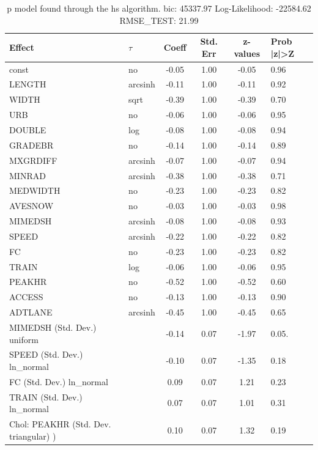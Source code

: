 \begin{table}
	\caption{p model found through the hs algorithm. bic: 45337.97 Log-Likelihood: -22584.62 RMSE_TEST: 21.99}
	\begin{center}
		\begin{tabular}{|l|l|c|c|c|l|}
			\hline
			Effect & $\tau$ & Coeff & Std. Err & z-values & Prob |z|>Z \\
			\hline
			const & no & -0.05 & 1.00 & -0.05 & 0.96 \\
			\hline
			LENGTH & arcsinh & -0.11 & 1.00 & -0.11 & 0.92 \\
			\hline
			WIDTH & sqrt & -0.39 & 1.00 & -0.39 & 0.70 \\
			\hline
			URB & no & -0.06 & 1.00 & -0.06 & 0.95 \\
			\hline
			DOUBLE & log & -0.08 & 1.00 & -0.08 & 0.94 \\
			\hline
			GRADEBR & no & -0.14 & 1.00 & -0.14 & 0.89 \\
			\hline
			MXGRDIFF & arcsinh & -0.07 & 1.00 & -0.07 & 0.94 \\
			\hline
			MINRAD & arcsinh & -0.38 & 1.00 & -0.38 & 0.71 \\
			\hline
			MEDWIDTH & no & -0.23 & 1.00 & -0.23 & 0.82 \\
			\hline
			AVESNOW & no & -0.03 & 1.00 & -0.03 & 0.98 \\
			\hline
			MIMEDSH & arcsinh & -0.08 & 1.00 & -0.08 & 0.93 \\
			\hline
			SPEED & arcsinh & -0.22 & 1.00 & -0.22 & 0.82 \\
			\hline
			FC & no & -0.23 & 1.00 & -0.23 & 0.82 \\
			\hline
			TRAIN & log & -0.06 & 1.00 & -0.06 & 0.95 \\
			\hline
			PEAKHR & no & -0.52 & 1.00 & -0.52 & 0.60 \\
			\hline
			ACCESS & no & -0.13 & 1.00 & -0.13 & 0.90 \\
			\hline
			ADTLANE & arcsinh & -0.45 & 1.00 & -0.45 & 0.65 \\
			\hline
			MIMEDSH (Std. Dev.) uniform &  & -0.14 & 0.07 & -1.97 & 0.05. \\
			\hline
			SPEED (Std. Dev.) ln_normal &  & -0.10 & 0.07 & -1.35 & 0.18 \\
			\hline
			FC (Std. Dev.) ln_normal &  & 0.09 & 0.07 & 1.21 & 0.23 \\
			\hline
			TRAIN (Std. Dev.) ln_normal &  & 0.07 & 0.07 & 1.01 & 0.31 \\
			\hline
			 Chol: PEAKHR (Std. Dev. triangular) ) &  & 0.10 & 0.07 & 1.32 & 0.19 \\

\end{tabular}
\end{center}
\end{table}

